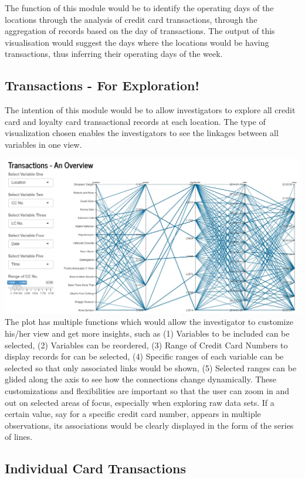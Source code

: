 \documentclass{acm_proc_article-sp}
\begin{document}
The function of this module would be to identify the operating days of
the locations through the analysis of credit card transactions, through
the aggregation of records based on the day of transactions. The output
of this visualisation would suggest the days where the locations would
be having transactions, thus inferring their operating days of the week.

\hypertarget{transactions---for-exploration}{%
\subsection{Transactions - For
Exploration!}\label{transactions---for-exploration}}

The intention of this module would be to allow investigators to explore
all credit card and loyalty card transactional records at each location.
The type of visualization chosen enables the investigators to see the
linkages between all variables in one view.

\includegraphics{img/P01Para.jpg} The plot has multiple functions which
would allow the investigator to customize his/her view and get more
insights, such as (1) Variables to be included can be selected, (2)
Variables can be reordered, (3) Range of Credit Card Numbers to display
records for can be selected, (4) Specific ranges of each variable can be
selected so that only associated links would be shown, (5) Selected
ranges can be glided along the axis to see how the connections change
dynamically. These customizations and flexibilities are important so
that the user can zoom in and out on selected areas of focus, especially
when exploring raw data sets. If a certain value, say for a specific
credit card number, appears in multiple observations, its associations
would be clearly displayed in the form of the series of lines.

\hypertarget{individual-card-transactions}{%
\subsection{Individual Card
Transactions}\label{individual-card-transactions}}
\end{document}
